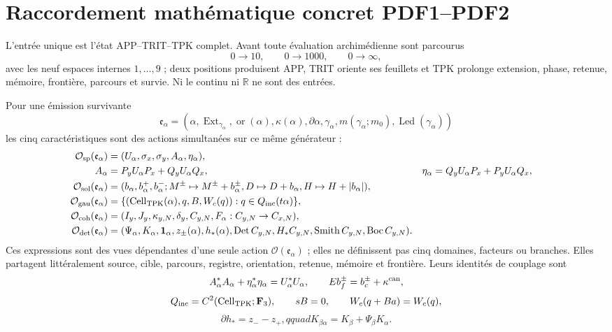 
\section*{Raccordement mathématique concret PDF1--PDF2}

L'entrée unique est l'état APP--TRIT--TPK complet. Avant toute évaluation archimédienne sont parcourus
\[
 0\longrightarrow10,\qquad 0\longrightarrow1000,
 \qquad 0\longrightarrow\infty,
\]
avec les neuf espaces internes \(1,\ldots,9\) ; deux positions produisent APP, TRIT oriente ses feuillets et TPK prolonge extension, phase, retenue, mémoire, frontière, parcours et survie. Ni le continu ni \(\mathbb R\) ne sont des entrées.

Pour une émission survivante
\[
 \mathfrak e_\alpha=
 (\alpha,\operatorname{Ext}_{\gamma_\alpha},\operatorname{or}(\alpha),
 \kappa(\alpha),\partial\alpha,\gamma_\alpha,
 m(\gamma_\alpha;m_0),\operatorname{Led}(\gamma_\alpha))
\]
les cinq caractéristiques sont des actions simultanées sur ce même générateur :
\begin{align*}
 \mathcal O_{\rm sp}(\mathfrak e_\alpha)
  &=(U_\alpha,\sigma_x,\sigma_y,A_\alpha,\eta_\alpha),\\
 A_\alpha&=P_yU_\alpha P_x+Q_yU_\alpha Q_x,
 &\eta_\alpha&=Q_yU_\alpha P_x+P_yU_\alpha Q_x,\\
 \mathcal O_{\rm sol}(\mathfrak e_\alpha)
  &=(b_\alpha,b_\alpha^+,b_\alpha^-;
  M^\pm\mapsto M^\pm+b_\alpha^\pm,
  D\mapsto D+b_\alpha,H\mapsto H+|b_\alpha|),\\
 \mathcal O_{\rm gau}(\mathfrak e_\alpha)
  &=\{(\operatorname{Cell}_{\rm TPK}(\alpha),q,B,W_c(q)):
      q\in Q_{\rm inc}(t\alpha)\},\\
 \mathcal O_{\rm coh}(\mathfrak e_\alpha)
  &=(I_y,J_y,\kappa_{y,N},\delta_y,C_{y,N},
      F_\alpha:C_{y,N}\to C_{x,N}),\\
 \mathcal O_{\rm det}(\mathfrak e_\alpha)
  &=(\Psi_\alpha,K_\alpha,\mathbf1_\alpha,z_\pm(\alpha),h_*(\alpha),
  \operatorname{Det}C_{y,N},H_*C_{y,N},\operatorname{Smith}C_{y,N},
  \operatorname{Boc}C_{y,N}).
\end{align*}
Ces expressions sont des vues dépendantes d'une seule action \(\mathcal O(\mathfrak e_\alpha)\) ; elles ne définissent pas cinq domaines, facteurs ou branches. Elles partagent littéralement source, cible, parcours, registre, orientation, retenue, mémoire et frontière. Leurs identités de couplage sont
\[
 A_\alpha^*A_\alpha+\eta_\alpha^*\eta_\alpha=U_\alpha^*U_\alpha,
 \qquad E b_f^\pm=b_c^\pm+\kappa^{\rm can},
\]
\[
 Q_{\rm inc}=C^2(\operatorname{Cell}_{\rm TPK};\mathbf F_3),
 \qquad sB=0,\qquad W_c(q+Ba)=W_c(q),
\]
\[
 \partial h_*=z_--z_+,qquad
 K_{\beta\alpha}=K_\beta+\Psi_\beta K_\alpha.
\]

